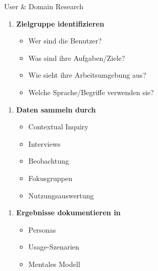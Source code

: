 \begin{KR}{User \& Domain Research}
\begin{enumerate}
    \item \textbf{Zielgruppe identifizieren}
    \begin{itemize}
        \item Wer sind die Benutzer?
        \item Was sind ihre Aufgaben/Ziele?
        \item Wie sieht ihre Arbeitsumgebung aus?
        \item Welche Sprache/Begriffe verwenden sie?
    \end{itemize}
\end{enumerate}

\begin{minipage}[t]{0.5\linewidth}
\begin{enumerate}[start=2]
    \item \textbf{Daten sammeln durch}
    \begin{itemize}
        \item Contextual Inquiry
        \item Interviews
        \item Beobachtung
        \item Fokusgruppen
        \item Nutzungsauswertung
    \end{itemize}
\end{enumerate}
\end{minipage}
\begin{minipage}[t]{0.5\linewidth}
\begin{enumerate}[start=3]
    \item \textbf{Ergebnisse dokumentieren in}
    \begin{itemize}
        \item Personas
        \item Usage-Szenarien
        \item Mentales Modell
    \end{itemize}
\end{enumerate}
\end{minipage}
\end{KR}

